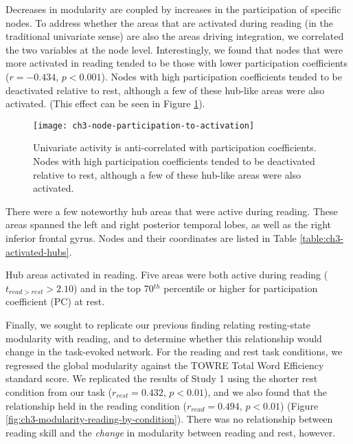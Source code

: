 Decreases in modularity are coupled by increases in the participation of specific nodes. To address whether the areas that are activated during reading (in the traditional univariate sense) are also the areas driving integration, we correlated the two variables at the node level. Interestingly, we found that nodes that were more activated in reading tended to be those with lower participation coefficients ($r = -0.434$, $p < 0.001$). Nodes with high participation coefficients tended to be deactivated relative to rest, although a few of these hub-like areas were also activated. (This effect can be seen in Figure \ref{fig:ch3-node-participation-to-activation}). 

\begin{figure}[t]
	\centering
	\texttt{[image: ch3-node-participation-to-activation]}
    \caption[Univariate activity is anti-correlated with participation coefficients]{Univariate activity is anti-correlated with participation coefficients. Nodes with high participation coefficients tended to be deactivated relative to rest, although a few of these hub-like areas were also activated.}
	\label{fig:ch3-node-participation-to-activation}
\end{figure}

There were a few noteworthy hub areas that were active during reading. These areas spanned the left and right posterior temporal lobes, as well as the right inferior frontal gyrus. Nodes and their coordinates are listed in Table \ref{table:ch3-activated-hubs}.

\begin{table}
	\renewcommand{\tabcolsep}{0.09cm}
	\centering
	
	\caption[Hub areas activated in reading]{Hub areas activated in reading. Five areas were both active during reading ($t_{read > rest} > 2.10$) and in the top 70$^{th}$ percentile or higher for participation coefficient (PC) at rest.}
	\label{table:ch3-activated-hubs}
\end{table}

Finally, we sought to replicate our previous finding relating resting-state modularity with reading, and to determine whether this relationship would change in the task-evoked network. For the reading and rest task conditions, we regressed the global modularity against the TOWRE Total Word Efficiency standard score. We replicated the results of Study 1 using the shorter rest condition from our task ($r_{rest} = 0.432$, $p < 0.01$), and we also found that the relationship held in the reading condition ($r_{read} = 0.494$, $p < 0.01$) (Figure \ref{fig:ch3-modularity-reading-by-condition}). There was no relationship between reading skill and the \textit{change} in modularity between reading and rest, however.  

